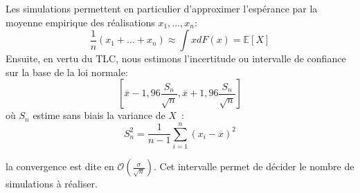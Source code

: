 %
%	
%	
%	
%	
%	
%	
%	
%	
%	

\begin{f}
	
	Les simulations permettent en particulier d'approximer l'espérance par la moyenne empirique des réalisations \(x_1,\ldots,x_n\):
	\[
	\frac{1}{n}(x_1+\ldots+x_n)\approx \int xdF(x)=\mathbb{E}[X]
	\]
	Ensuite, en vertu du TLC, nous estimons l'incertitude ou intervalle de confiance sur la base de la loi normale:
	\[
	\left[\overline{x}-1,96\frac{S_n}{\sqrt{n}},\overline{x}+1,96\frac{S_n}{\sqrt{n}}\right]
	\]
	où \(S_n\) estime sans biais la variance de \(X\)~:
	\[
	S_n^2=\frac{1}{n-1}\sum_{i=1}^{n}(x_i-\overline{x})^2
	\]
	
	la convergence est dite en \(\mathcal{O}(\frac{\sigma}{\sqrt{n}})\). 	
	Cet intervalle permet de décider le nombre de simulations à réaliser.
\end{f}


